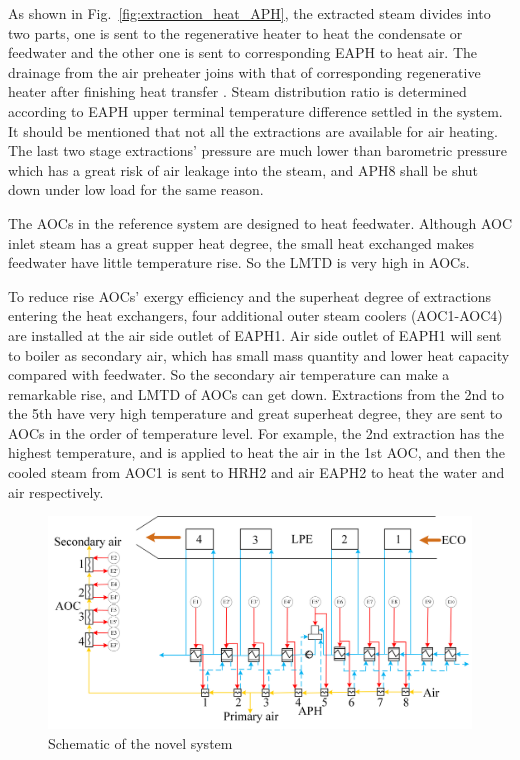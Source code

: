 \documentclass[preprint,12pt]{elsarticle}
\begin{document}
As shown in Fig.~\ref{fig:extraction_heat_APH}, the extracted steam divides into two parts, one is sent to the regenerative heater to heat the condensate or feedwater and the other one is sent to corresponding EAPH to heat air.
The drainage from the air preheater joins with that of corresponding regenerative heater after finishing heat transfer .
Steam distribution ratio is determined according to EAPH upper terminal temperature difference settled in the system.
It should be mentioned that not all the extractions are available for air heating.
The last two stage extractions' pressure are much lower than barometric pressure which has a great risk of air leakage into the steam, and APH8 shall be shut down under low load for the same reason.

The AOCs in the reference system are designed to heat feedwater.
Although AOC inlet steam has a great supper heat degree, the small heat exchanged makes feedwater have little temperature rise.
So the LMTD is very high in AOCs.

To reduce rise AOCs' exergy efficiency and the superheat degree of extractions entering the heat exchangers, four additional outer steam coolers (AOC1-AOC4) are installed at the air side outlet of EAPH1.
Air side outlet of EAPH1 will sent to boiler as secondary air, which has small mass quantity and lower heat capacity compared with feedwater. 
So the secondary air temperature can make a remarkable rise, and LMTD of AOCs can get down.
Extractions from the 2nd to the 5th have very high temperature and great superheat degree, they are sent to AOCs in the order of temperature level.
For example, the 2nd extraction has the highest temperature, and is applied to heat the air in the 1st AOC, and then the cooled steam from AOC1 is sent to HRH2 and air EAPH2 to heat the water and air respectively.  

\begin{figure}[htbp]
\centering
\includegraphics[width=1\textwidth]{fig/novel_system.png}
\caption{Schematic of the novel system} 
\label{fig:novel_system}
\end{figure}
\end{document}
